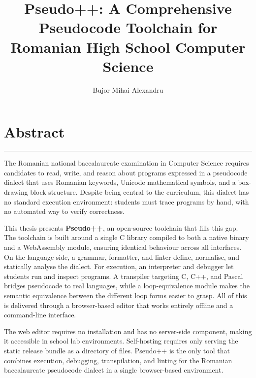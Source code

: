 \documentclass[12pt]{report}
\begin{document}
\title{Pseudo++: A Comprehensive Pseudocode Toolchain for Romanian High School Computer Science}
\author{Bujor Mihai Alexandru}

\maketitle

\newpage
\thispagestyle{empty}
\mbox{}
\newpage
{}

\cleardoublepage
\chapter*{Abstract}
\vspace{0.5cm}
\hrule
\vspace{0.5cm}

The Romanian national baccalaureate examination in Computer Science requires
candidates to read, write, and reason about programs expressed in a pseudocode
dialect that uses Romanian keywords, Unicode mathematical symbols, and a
box-drawing block structure.  Despite being central to the curriculum, this
dialect has no standard execution environment: students must trace programs
by hand, with no automated way to verify correctness.

This thesis presents \textbf{Pseudo++}, an open-source toolchain that fills
this gap.  The toolchain is built around a single C library compiled to both
a native binary and a WebAssembly module, ensuring identical behaviour across
all interfaces.  On the language side, a grammar, formatter, and linter
define, normalise, and statically analyse the dialect.  For execution, an
interpreter and debugger let students run and inspect programs.  A transpiler
targeting C, C++, and Pascal bridges pseudocode to real languages, while a
loop-equivalence module makes the semantic equivalence between the different
loop forms easier to grasp.  All of this is delivered through a browser-based
editor that works entirely offline and a command-line interface.

The web editor requires no installation and has no server-side component,
making it accessible in school lab environments.  Self-hosting requires only
serving the static release bundle as a directory of files.  Pseudo++ is
the only tool that combines execution, debugging, transpilation, and linting
for the Romanian baccalaureate pseudocode dialect in a single browser-based
environment.


\tableofcontents

\newpage
{}









\end{document}
